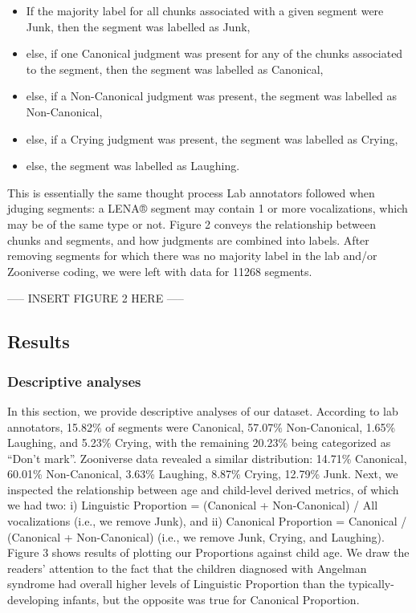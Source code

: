 \documentclass[english,,man]{apa6}
\providecommand{\tightlist}{%
  \setlength{\itemsep}{0pt}\setlength{\parskip}{0pt}}
\begin{document}
\begin{itemize}
\tightlist
\item
  If the majority label for all chunks associated with a given segment were Junk, then the segment was labelled as Junk,\\
\item
  else, if one Canonical judgment was present for any of the chunks associated to the segment, then the segment was labelled as Canonical,
\item
  else, if a Non-Canonical judgment was present, the segment was labelled as Non-Canonical,
\item
  else, if a Crying judgment was present, the segment was labelled as Crying,
\item
  else, the segment was labelled as Laughing.
\end{itemize}

This is essentially the same thought process Lab annotators followed when jduging segments: a LENA® segment may contain 1 or more vocalizations, which may be of the same type or not. Figure 2 conveys the relationship between chunks and segments, and how judgments are combined into labels. After removing segments for which there was no majority label in the lab and/or Zooniverse coding, we were left with data for 11268 segments.

----- INSERT FIGURE 2 HERE -----

\hypertarget{results}{%
\subsection{Results}\label{results}}

\hypertarget{descriptive-analyses}{%
\subsubsection{Descriptive analyses}\label{descriptive-analyses}}

In this section, we provide descriptive analyses of our dataset. According to lab annotators, 15.82\% of segments were Canonical, 57.07\% Non-Canonical, 1.65\% Laughing, and 5.23\% Crying, with the remaining 20.23\% being categorized as \enquote{Don't mark}. Zooniverse data revealed a similar distribution: 14.71\% Canonical, 60.01\% Non-Canonical, 3.63\% Laughing, 8.87\% Crying, 12.79\% Junk.
Next, we inspected the relationship between age and child-level derived metrics, of which we had two: i) Linguistic Proportion = (Canonical + Non-Canonical) / All vocalizations (i.e., we remove Junk), and ii) Canonical Proportion = Canonical / (Canonical + Non-Canonical) (i.e., we remove Junk, Crying, and Laughing). Figure 3 shows results of plotting our Proportions against child age. We draw the readers' attention to the fact that the children diagnosed with Angelman syndrome had overall higher levels of Linguistic Proportion than the typically-developing infants, but the opposite was true for Canonical Proportion.
\end{document}
